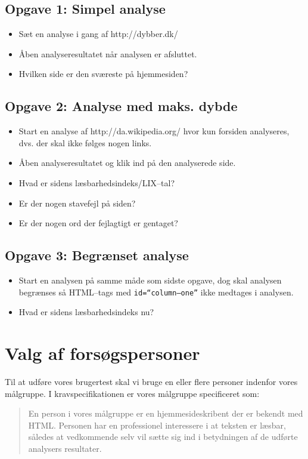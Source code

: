 \documentclass[a4paper,oneside,article]{memoir}
\begin{document}
\subsection{Opgave 1: Simpel analyse}
\begin{itemize}
\item Sæt en analyse i gang af http://dybber.dk/
\item Åben analyseresultatet når analysen er afsluttet.
\item Hvilken side er den sværeste på hjemmesiden?
\end{itemize}

\subsection{Opgave 2: Analyse med maks. dybde}
\begin{itemize}
\item Start en analyse af http://da.wikipedia.org/ hvor kun forsiden
  analyseres, dvs. der skal ikke følges nogen links.
\item Åben analyseresultatet og klik ind på den analyserede side.
\item Hvad er sidens læsbarhedsindeks/LIX--tal?
\item Er der nogen stavefejl på siden?
\item Er der nogen ord der fejlagtigt er gentaget?
\end{itemize}

\subsection{Opgave 3: Begrænset analyse}
\begin{itemize}
\item Start en analysen på samme måde som sidste opgave, dog skal
  analysen begrænses så HTML--tags med \texttt{id=``column--one''} ikke
  medtages i analysen.
\item Hvad er sidens læsbarhedsindeks nu?
\end{itemize}
\newpage
\section{Valg af forsøgspersoner}
Til at udføre vores brugertest skal vi bruge en eller flere personer
indenfor vores målgruppe. I kravspecifikationen er vores målgruppe
specificeret som:
\begin{quote}
En person i vores målgruppe er en hjemmesideskribent der er bekendt
med HTML. Personen har en professionel interessere i at teksten er
læsbar, således at vedkommende selv vil sætte sig ind i betydningen af
de udførte analysers resultater.
\end{quote}
\end{document}
